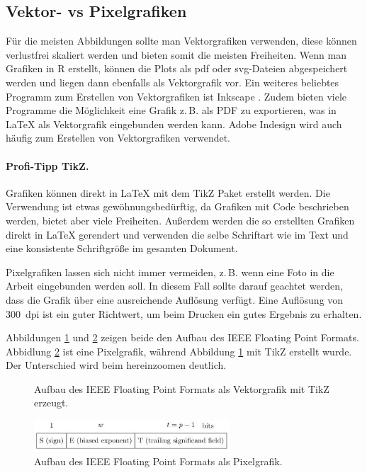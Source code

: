 \subsection{Vektor- vs Pixelgrafiken}
Für die meisten Abbildungen sollte man Vektorgrafiken verwenden, diese können verlustfrei skaliert werden und bieten somit die meisten Freiheiten.
Wenn man Grafiken in R erstellt, können die Plots als pdf oder svg-Dateien abgespeichert werden und liegen dann ebenfalls als Vektorgrafik vor. Ein weiteres beliebtes Programm zum Erstellen von Vektorgrafiken ist Inkscape \cite{inkscape}. Zudem bieten viele Programme die Möglichkeit eine Grafik z.\,B. als PDF zu exportieren, was in \LaTeX{} als Vektorgrafik eingebunden werden kann. Adobe Indesign wird auch häufig zum Erstellen von Vektorgrafiken verwendet.

\paragraph{Profi-Tipp TikZ.}
Grafiken können direkt in \LaTeX{} mit dem TikZ Paket \cite{tikz} erstellt werden. Die Verwendung ist etwas gewöhnungsbedürftig, da Grafiken mit Code beschrieben werden, bietet aber viele Freiheiten. Außerdem werden die so erstellten Grafiken direkt in \LaTeX{} gerendert und verwenden die selbe Schriftart wie im Text und eine konsistente Schriftgröße im gesamten Dokument. 

Pixelgrafiken lassen sich nicht immer vermeiden, z.\,B. wenn eine Foto in die Arbeit eingebunden werden soll. In diesem Fall sollte darauf geachtet werden, dass die Grafik über eine ausreichende Auflösung verfügt. Eine Auflösung von 300~dpi ist ein guter Richtwert, um beim Drucken ein gutes Ergebnis zu erhalten.

Abbildungen \ref{fig:ieee_float_format_vector} und \ref{fig:ieee_float_format_pixel} zeigen beide den Aufbau des IEEE Floating Point Formats. Abbidlung \ref{fig:ieee_float_format_pixel} ist eine Pixelgrafik, während Abbildung \ref{fig:ieee_float_format_vector} mit TikZ erstellt wurde. Der Unterschied wird beim hereinzoomen deutlich.

\begin{figure}[ht]
\centering

\caption{Aufbau des IEEE Floating Point Formats als Vektorgrafik mit TikZ erzeugt.}
\label{fig:ieee_float_format_vector}
\end{figure}

\begin{figure}[ht]
\centering
\includegraphics[width=0.65\textwidth]{figures/ieee_float_format.jpg}
\caption{Aufbau des IEEE Floating Point Formats als Pixelgrafik.}
\label{fig:ieee_float_format_pixel}
\end{figure}

